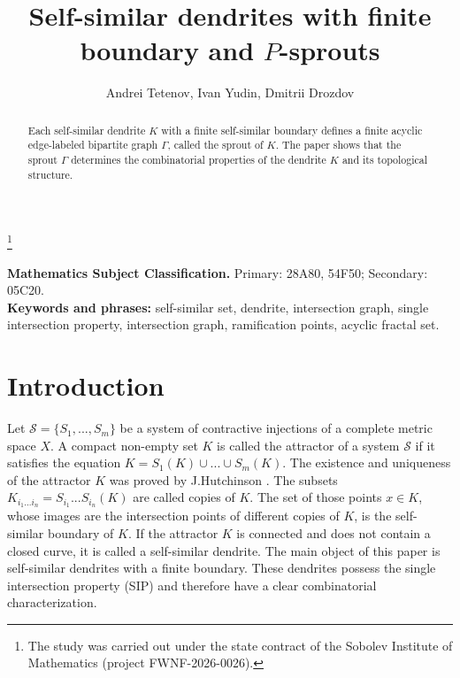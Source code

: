 \documentclass[11pt,reqno]{amsart}
\newcommand{\eS}{{\mathcal S}}
\begin{document}
\title{Self-similar dendrites with finite boundary and $P$-sprouts}
\thanks{The study was carried out under the state contract of the Sobolev Institute of Mathematics (project FWNF-2026-0026).}
\date{}
\author[Andrei Tetenov, Ivan Yudin, Dmitrii Drozdov]{Andrei Tetenov, Ivan Yudin, Dmitrii Drozdov}
\begin{abstract}
Each self-similar dendrite $K$ with a finite self-similar boundary defines a finite acyclic edge-labeled bipartite graph $\Gamma$,  called the sprout of $K$. The paper shows that the sprout  $\Gamma$   determines the combinatorial properties of the dendrite $K$ and its topological structure.\\


\end{abstract}
\maketitle
\textbf{Mathematics Subject Classification.} Primary: 28A80, 54F50; Secondary: 05C20.\\
\textbf{Keywords and phrases:} self-similar set,  dendrite,   intersection graph,  single intersection property, intersection graph, ramification points, acyclic fractal set.




\section{Introduction}
Let $\eS=\{S_1,...,S_m\} $ be a system  of contractive injections of a complete metric space $X$.
A  compact non-empty set $K$ is called the attractor of a system $\mathcal{S}$ if it satisfies the equation
$K=S_1(K)\cup...\cup S_m(K)$.   The existence and uniqueness of the attractor $K$ was proved by J.Hutchinson \cite{Hut}. 
The subsets $K_{i_1...i_n}= S_{i_1}...S_{i_n}(K)$ are called  copies of $K$. 
The set of those points $x\in K$, whose images are the intersection points of different copies of $K$, is the self-similar boundary of $K$. 
If the attractor $K$ is connected and does not contain a closed curve, it  is called a self-similar dendrite. 
The main object of this paper is self-similar dendrites with a finite boundary. 
These dendrites possess the single intersection property (SIP) and therefore have a clear combinatorial characterization.\\
\end{document}
